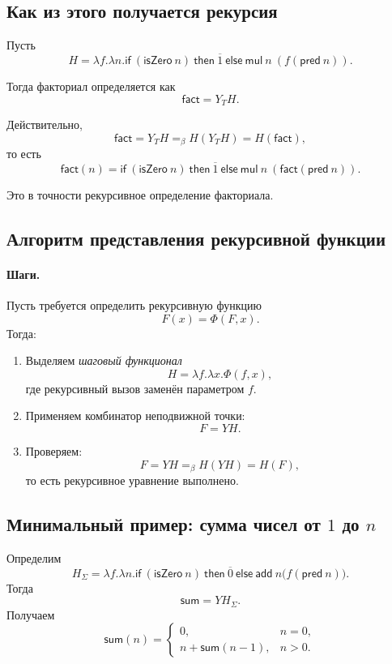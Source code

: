 \documentclass[12pt,a4paper]{article}
\theoremstyle{remark}
\begin{document}
\subsection{Как из этого получается рекурсия}

Пусть
\[
H=
\lambda f.\lambda n.\mathsf{if}\ (\mathsf{isZero}\ n)\ \mathsf{then}\ \overline{1}\ \mathsf{else}\ \mathsf{mul}\ n\ (f(\mathsf{pred}\ n)).
\]

Тогда факториал определяется как
\[
\mathsf{fact}=Y_T H.
\]

Действительно,
\[
\mathsf{fact}
=
Y_T H
=_\beta
H(Y_T H)
=
H(\mathsf{fact}),
\]
то есть
\[
\mathsf{fact}(n)
=
\mathsf{if}\ (\mathsf{isZero}\ n)\ \mathsf{then}\ \overline{1}\ \mathsf{else}\ \mathsf{mul}\ n\ (\mathsf{fact}(\mathsf{pred}\ n)).
\]

Это в точности рекурсивное определение факториала.

\subsection{Алгоритм представления рекурсивной функции}

\paragraph{Шаги.}
Пусть требуется определить рекурсивную функцию
\[
F(x)=\Phi(F,x).
\]
Тогда:

\begin{enumerate}
    \item Выделяем \emph{шаговый функционал}
    \[
    H=\lambda f.\lambda x.\Phi(f,x),
    \]
    где рекурсивный вызов заменён параметром $f$.
    \item Применяем комбинатор неподвижной точки:
    \[
    F=YH.
    \]
    \item Проверяем:
    \[
    F=YH=_\beta H(YH)=H(F),
    \]
    то есть рекурсивное уравнение выполнено.
\end{enumerate}

\subsection{Минимальный пример: сумма чисел от $1$ до $n$}

Определим
\[
H_{\Sigma}
=
\lambda f.\lambda n.
\mathsf{if}\ (\mathsf{isZero}\ n)\ \mathsf{then}\ \overline{0}\ \mathsf{else}\ \mathsf{add}\ n\bigl(f(\mathsf{pred}\ n)\bigr).
\]
Тогда
\[
\mathsf{sum}=YH_{\Sigma}.
\]
Получаем
\[
\mathsf{sum}(n)=
\begin{cases}
0,& n=0,\\
n+\mathsf{sum}(n-1),& n>0.
\end{cases}
\]
\end{document}
